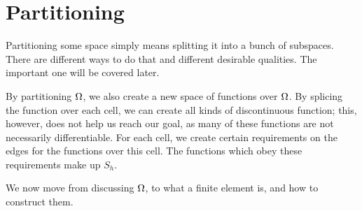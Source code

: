 \section{Partitioning}
Partitioning some space simply means splitting it into a bunch of subspaces. 
There are different ways to do that and different desirable qualities. 
The important one will be covered later.

By partitioning $\Omega$, we also create a new space of functions over $\Omega$. 
By splicing the function over each cell, we can create all kinds of 
discontinuous function; this, however, does not help us reach our goal, 
as many of these functions are not necessarily differentiable. 
For each cell, we create certain requirements on the edges for the functions 
over this cell. The functions which obey these requirements make up $S_h$.




We now move from discussing $\Omega$, to what a finite element is,
and how to construct them.